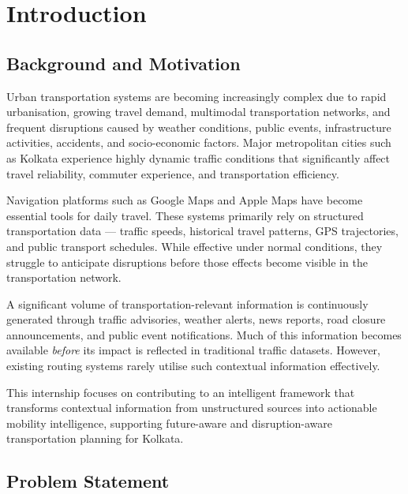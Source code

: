 \documentclass[12pt, a4paper]{report}
\begin{document}
\clearpage

\chapter{Introduction}
\label{chap:introduction}

\section{Background and Motivation}

Urban transportation systems are becoming increasingly complex due to rapid urbanisation, growing travel demand, multimodal transportation networks, and frequent disruptions caused by weather conditions, public events, infrastructure activities, accidents, and socio-economic factors. Major metropolitan cities such as Kolkata experience highly dynamic traffic conditions that significantly affect travel reliability, commuter experience, and transportation efficiency.

Navigation platforms such as Google Maps and Apple Maps have become essential tools for daily travel. These systems primarily rely on structured transportation data — traffic speeds, historical travel patterns, GPS trajectories, and public transport schedules. While effective under normal conditions, they struggle to anticipate disruptions before those effects become visible in the transportation network.

A significant volume of transportation-relevant information is continuously generated through traffic advisories, weather alerts, news reports, road closure announcements, and public event notifications. Much of this information becomes available \textit{before} its impact is reflected in traditional traffic datasets. However, existing routing systems rarely utilise such contextual information effectively.

This internship focuses on contributing to an intelligent framework that transforms contextual information from unstructured sources into actionable mobility intelligence, supporting future-aware and disruption-aware transportation planning for Kolkata.

\section{Problem Statement}
\end{document}
